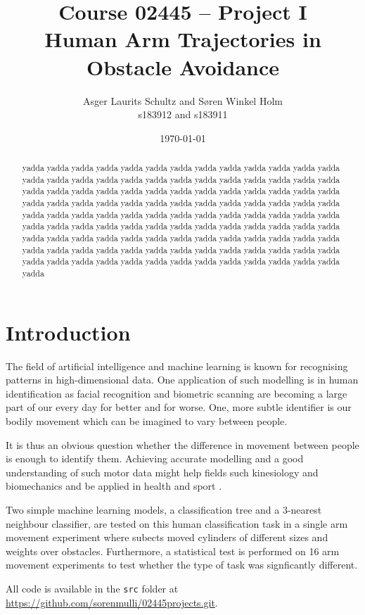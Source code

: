 \documentclass[11pt,fleqn]{article}
\title{Course 02445 -- Project I\\Human Arm Trajectories in Obstacle Avoidance}
\author{Asger Laurits Schultz and Søren Winkel Holm\\s183912 and s183911}
\date{\today}
\begin{document}
\maketitle
\thispagestyle{empty}
\renewcommand{\abstractname}{Summary}
\begin{abstract}
yadda yadda yadda yadda yadda yadda yadda yadda yadda yadda yadda yadda yadda yadda yadda yadda yadda yadda yadda yadda yadda yadda yadda yadda yadda yadda yadda yadda yadda yadda yadda yadda yadda yadda yadda yadda yadda yadda yadda yadda yadda yadda yadda yadda yadda yadda yadda yadda yadda yadda yadda yadda yadda yadda yadda yadda yadda yadda yadda yadda yadda yadda yadda yadda yadda yadda yadda yadda yadda yadda yadda yadda yadda yadda yadda yadda yadda yadda yadda yadda yadda yadda yadda yadda yadda yadda yadda yadda yadda yadda yadda yadda yadda yadda yadda yadda yadda yadda yadda yadda yadda yadda yadda yadda yadda yadda yadda yadda yadda yadda yadda yadda yadda yadda yadda yadda yadda yadda 
\end{abstract}
\clearpage
\newpage
\setcounter{page}{1}


\section{Introduction}
The field of artificial intelligence and machine learning is known for recognising patterns in high-dimensional data. 
One application of such modelling is in human identification as facial recognition and biometric scanning are becoming a large part of our every day for better and for worse. One, more subtle identifier is our bodily movement which can be imagined to vary between people.

It is thus an obvious question whether the difference in movement between people is enough to identify them. Achieving accurate modelling and a good understanding of such motor data might help fields such kinesiology and biomechanics and be applied in health and sport \cite{kine}.

Two simple machine learning models, a classification tree and a 3-nearest neighbour classifier, are tested on this human classification task in a single arm movement experiment where subects moved cylinders of different sizes and weights over obstacles. Furthermore, a statistical test is performed on 16 arm movement experiments to test whether the type of task was signficantly different.

All code is available in the \texttt{src} folder at \url{https://github.com/sorenmulli/02445projects.git}.
\end{document}
